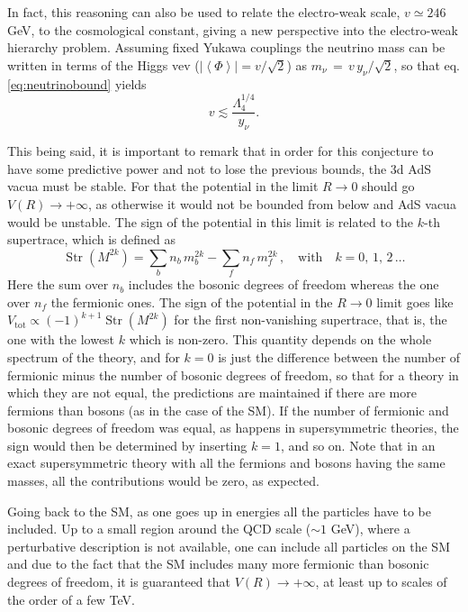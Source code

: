 \documentclass[11pt,a4paper]{article}
\begin{document}
In fact, this reasoning can also be used to relate the electro-weak scale, $v \simeq 246$ GeV,  to the cosmological constant, giving a new perspective into the electro-weak hierarchy problem. Assuming fixed Yukawa couplings the neutrino mass can be written in terms of the Higgs vev ($\left| \left\langle \Phi \right\rangle \right|=v/\sqrt{2}$) as $m_{\nu}\, =\, v \, y_{\nu} /\sqrt{2} $, so that  eq. \eqref{eq:neutrinobound} yields
\begin{equation}
\label{eq:EWccbound}
v \lesssim \dfrac{\Lambda_{4}^{1/4} }{y_{\nu}}.
\end{equation}

This being said, it is important to remark that in order for this conjecture to have some predictive power and not to lose the previous bounds, the 3d AdS vacua must be stable. For that the potential in the limit $R \rightarrow 0$ should go $V(R) \rightarrow  + \infty$, as otherwise it would not be bounded from below and AdS vacua would be unstable.  The sign of the potential in this limit is related to the $k$-th supertrace, which is defined as
\begin{equation}
\label{eq:supertrace}
\operatorname{Str}\left(M^{2 k}\right)=\sum_{b} n_{b} \, m_{b}^{2 k}-\sum_{f}  n_{f} \,  m_{f}^{2 k} \, , \quad \mathrm{with} \quad  k=0, \, 1, \, 2 \, \ldots 
\end{equation}
Here the sum over $n_b$ includes the bosonic degrees of freedom whereas the one over $n_f$ the fermionic ones. The sign of the potential in the $R\rightarrow 0$ limit goes like  \mbox{$ V_{\mathrm{tot}} \propto (-1)^{k+1} \operatorname{Str}\left(M^{2 k}\right)$} for the first non-vanishing supertrace, that is, the one with the lowest $k$ which is non-zero.  This quantity depends on the whole spectrum of the theory, and for $k=0$ is just the difference between the number of fermionic minus the number of bosonic degrees of freedom, so that for a theory in which they are not equal, the predictions are maintained if there are more fermions than bosons (as in the case of the SM). If the number of fermionic and bosonic degrees of freedom was equal, as happens in supersymmetric theories, the sign would then be determined by inserting $k=1$, and so on. Note that in an exact supersymmetric theory with all the fermions and bosons having the same masses, all the contributions would be zero, as expected. 

Going back to the SM, as one goes up in energies all the particles have to be included. Up to a small region around the QCD scale ($\sim 1$ GeV), where a perturbative description is not available, one can include all particles on the SM and due to the fact that the SM includes many more fermionic than bosonic degrees of freedom, it is guaranteed that $V(R) \rightarrow  + \infty$, at least up to scales of the order of  a few TeV.  
\end{document}

